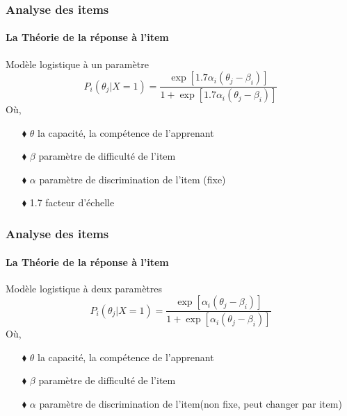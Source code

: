 \documentclass[aspectratio=169,professionalfonts, 12pt]{beamer}
\begin{document}
\begin{frame}
  \frametitle{Analyse des items}
  \framesubtitle{La Théorie de la réponse à l'item}
  \justifying
  \begin{minipage}{\textwidth}
  \begin{block}{Modèle logistique à un paramètre}
    \begin{equation}
      P_{i}(\theta_{j} | X=1) = \frac{\exp \left[ 1.7 \alpha_{i}(\theta_{j}-\beta_{i}) \right]  }{1+ \exp \left[1.7 \alpha_{i}(\theta_{j}-\beta_{i}) \right]  } 
    \end{equation}
    Où, \\
    \begin{itemize}
      \item[$\blacklozenge$] \(\displaystyle \theta \) la capacité, la compétence de l'apprenant 
      \item[$\blacklozenge$] \(\displaystyle \beta \) paramètre de difficulté de l'item
      \item[$\blacklozenge$] \(\displaystyle \alpha \) paramètre de discrimination de l'item (fixe)
      \item[$\blacklozenge$] 1.7 facteur d'échelle 
    \end{itemize}
  \end{block}  
  \end{minipage} 
\end{frame}

\begin{frame}
  \frametitle{Analyse des items}
  \framesubtitle{La Théorie de la réponse à l'item}
  \justifying
  \begin{minipage}{\textwidth}
  \begin{block}{Modèle logistique à deux paramètres}
    \begin{equation}
      P_{i}(\theta_{j} | X=1) = \frac{\exp \left[ \alpha_{i}(\theta_{j}-\beta_{i}) \right]  }{1+ \exp \left[ \alpha_{i}(\theta_{j}-\beta_{i}) \right]  } 
    \end{equation}
    Où, \\
    \begin{itemize}
      \item[$\blacklozenge$] \(\displaystyle \theta \) la capacité, la compétence de l'apprenant 
      \item[$\blacklozenge$] \(\displaystyle \beta \) paramètre de difficulté de l'item
      \item[$\blacklozenge$] \(\displaystyle \alpha \) paramètre de discrimination de l'item(non fixe, peut changer par item)
    \end{itemize}
  \end{block}  
  \end{minipage} 
\end{frame}
\end{document}
